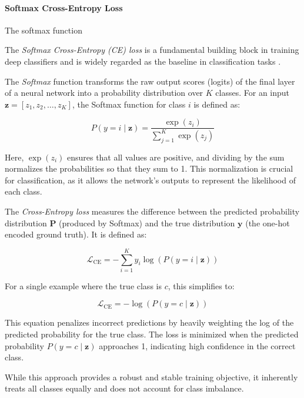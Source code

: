 \paragraph{Softmax Cross-Entropy Loss}
The softmax function 

The \emph{Softmax Cross-Entropy (CE) loss} is a fundamental building block in training deep classifiers and is widely regarded as the baseline in classification tasks \cite{zhang2023deep, cs231n, pytorch_crossentropy}. 

The \textit{Softmax} function transforms the raw output scores (logits) of the final layer of a neural network into a probability distribution over \( K \) classes. For an input \( \mathbf{z} = [z_1, z_2, \dots, z_K] \), the Softmax function for class \( i \) is defined as:

\begin{equation}
    P(y = i \mid \mathbf{z}) = \frac{\exp(z_i)}{\sum_{j=1}^{K} \exp(z_j)}
\end{equation}

Here, \( \exp(z_i) \) ensures that all values are positive, and dividing by the sum normalizes the probabilities so that they sum to 1. This normalization is crucial for classification, as it allows the network's outputs to represent the likelihood of each class.

The \textit{Cross-Entropy loss} measures the difference between the predicted probability distribution \( \mathbf{P} \) (produced by Softmax) and the true distribution \( \mathbf{y} \) (the one-hot encoded ground truth). It is defined as:

\begin{equation}
    \mathcal{L}_{\text{CE}} = -\sum_{i=1}^{K} y_i \log(P(y = i \mid \mathbf{z}))
\end{equation}

For a single example where the true class is \( c \), this simplifies to:

\begin{equation}
    \mathcal{L}_{\text{CE}} = -\log(P(y = c \mid \mathbf{z}))
\end{equation}

This equation penalizes incorrect predictions by heavily weighting the log of the predicted probability for the true class. The loss is minimized when the predicted probability \( P(y = c \mid \mathbf{z}) \) approaches 1, indicating high confidence in the correct class.

While this approach provides a robust and stable training objective, it inherently treats all classes equally and does not account for class imbalance.

